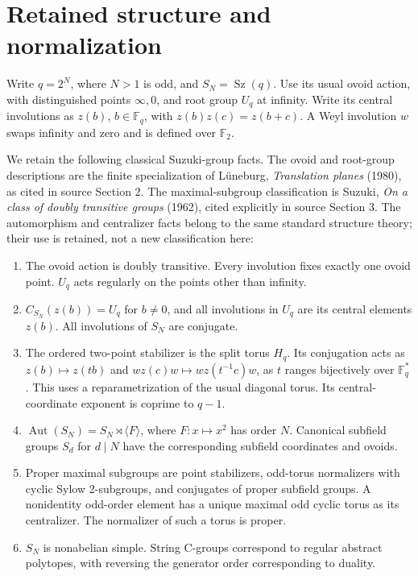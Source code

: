 \section{Retained structure and
normalization}\label{retained-structure-and-normalization}

Write \(q=2^N\), where \(N>1\) is odd, and \(S_N=\operatorname{Sz}(q)\).
Use its usual ovoid action, with distinguished points \(\infty,0\), and
root group \(U_q\) at infinity. Write its central involutions as
\(z(b)\), \(b\in\mathbb F_q\), with \(z(b)z(c)=z(b+c)\). A Weyl
involution \(w\) swaps infinity and zero and is defined over
\(\mathbb F_2\).

We retain the following classical Suzuki-group facts. The ovoid and
root-group descriptions are the finite specialization of Lüneburg,
\emph{Translation planes} (1980), as cited in source Section 2.
The maximal-subgroup classification is Suzuki, \emph{On a class of doubly
transitive groups} (1962), cited explicitly in source Section 3.
The automorphism and centralizer facts belong to the same standard
structure theory; their use is retained, not a new classification here:

\begin{enumerate}
\def\labelenumi{\arabic{enumi}.}
\tightlist
\item
  The ovoid action is doubly transitive. Every involution fixes exactly
  one ovoid point. \(U_q\) acts regularly on the points other than
  infinity.
\item
  \(C_{S_N}(z(b))=U_q\) for \(b\ne0\), and all involutions in \(U_q\)
  are its central elements \(z(b)\). All involutions of \(S_N\) are
  conjugate.
\item
  The ordered two-point stabilizer is the split torus \(H_q\). Its
  conjugation acts as \(z(b)\mapsto z(tb)\) and
  \(wz(c)w\mapsto wz(t^{-1}c)w\), as \(t\) ranges bijectively over
  \(\mathbb F_q^*\). This uses a reparametrization of the usual diagonal
  torus. Its central-coordinate exponent is coprime to \(q-1\).
\item
  \(\operatorname{Aut}(S_N)=S_N\rtimes\langle F\rangle\), where
  \(F:x\mapsto x^2\) has order \(N\). Canonical subfield groups \(S_d\)
  for \(d\mid N\) have the corresponding subfield coordinates and
  ovoids.
\item
  Proper maximal subgroups are point stabilizers, odd-torus normalizers
  with cyclic Sylow 2-subgroups, and conjugates of proper subfield
  groups. A nonidentity odd-order element has a unique maximal odd
  cyclic torus as its centralizer. The normalizer of such a torus is
  proper.
\item
  \(S_N\) is nonabelian simple. String C-groups correspond to regular
  abstract polytopes, with reversing the generator order corresponding
  to duality.
\end{enumerate}


